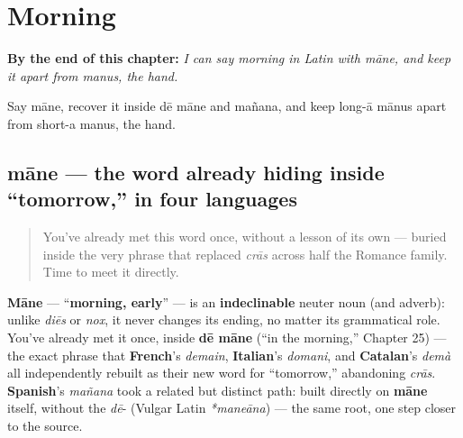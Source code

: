 
\chapter{Morning}
\label{ch:la-morning}

\begin{chapteropening}
\textbf{By the end of this chapter:} \emph{I can say morning in Latin with māne, and keep it apart from manus, the hand.}

Say māne, recover it inside dē māne and mañana, and keep long-ā mānus apart from short-a manus, the hand.
\end{chapteropening}

\section[māne]{māne — the word already hiding inside \textquotedblleft{}tomorrow,\textquotedblright{} in four languages}

\label{lesson:LA-C31-mane}



\begin{quote}
You've already met this word once, without a lesson of its own — buried inside the very phrase that replaced \emph{crās} across half the Romance family. Time to meet it directly.
\end{quote}

\begin{grammarlens}[title={Grammar Lens: māne — \textquotedblleft{}morning,\textquotedblright{} an indeclinable word}]
\textbf{Māne} — \textquotedblleft{}\textbf{morning, early}\textquotedblright{} — is an \textbf{indeclinable} neuter noun (and adverb): unlike \emph{diēs} or \emph{nox}, it never changes its ending, no matter its grammatical role. You've already met it once, inside \textbf{dē māne} (\textquotedblleft{}in the morning,\textquotedblright{} Chapter 25) — the exact phrase that \textbf{French}'s \emph{demain}, \textbf{Italian}'s \emph{domani}, and \textbf{Catalan}'s \emph{demà} all independently rebuilt as their new word for \textquotedblleft{}tomorrow,\textquotedblright{} abandoning \emph{crās}. \textbf{Spanish}'s \emph{mañana} took a related but distinct path: built directly on \textbf{māne} itself, without the \emph{dē}- (Vulgar Latin \emph{*maneāna}) — the same root, one step closer to the source.
\end{grammarlens}

